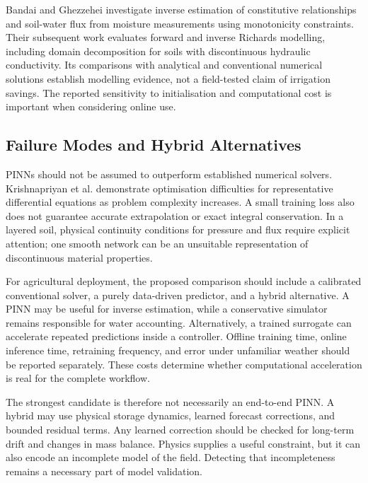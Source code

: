 \documentclass[11pt,a4paper]{article}
\begin{document}
Bandai and Ghezzehei \cite{R15} investigate inverse estimation of constitutive relationships and soil-water flux from moisture measurements using monotonicity constraints. Their subsequent work \cite{R16} evaluates forward and inverse Richards modelling, including domain decomposition for soils with discontinuous hydraulic conductivity. Its comparisons with analytical and conventional numerical solutions establish modelling evidence, not a field-tested claim of irrigation savings. The reported sensitivity to initialisation and computational cost is important when considering online use.

\subsection{Failure Modes and Hybrid Alternatives}

\label{sec:6-2}

PINNs should not be assumed to outperform established numerical solvers. Krishnapriyan et al. \cite{R17} demonstrate optimisation difficulties for representative differential equations as problem complexity increases. A small training loss also does not guarantee accurate extrapolation or exact integral conservation. In a layered soil, physical continuity conditions for pressure and flux require explicit attention; one smooth network can be an unsuitable representation of discontinuous material properties.

For agricultural deployment, the proposed comparison should include a calibrated conventional solver, a purely data-driven predictor, and a hybrid alternative. A PINN may be useful for inverse estimation, while a conservative simulator remains responsible for water accounting. Alternatively, a trained surrogate can accelerate repeated predictions inside a controller. Offline training time, online inference time, retraining frequency, and error under unfamiliar weather should be reported separately. These costs determine whether computational acceleration is real for the complete workflow.

The strongest candidate is therefore not necessarily an end-to-end PINN. A hybrid may use physical storage dynamics, learned forecast corrections, and bounded residual terms. Any learned correction should be checked for long-term drift and changes in mass balance. Physics supplies a useful constraint, but it can also encode an incomplete model of the field. Detecting that incompleteness remains a necessary part of model validation.
\end{document}
